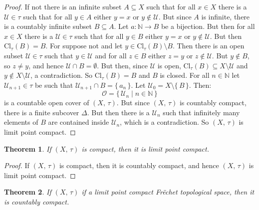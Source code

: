 \documentclass{article}
\theoremstyle{plain}
\newtheorem{theorem}{Theorem}[section]
\theoremstyle{normal}
\begin{document}
        \begin{proof}
            If not there is an infinite subset $A\subseteq{X}$ such that for
            all $x\in{X}$ there is a $\mathcal{U}\in\tau$ such that for all
            $y\in{A}$ either $y=x$ or $y\notin\mathcal{U}$. But since
            $A$ is infinite, there is a countably infinite subset
            $B\subseteq{A}$. Let $a:\mathbb{N}\rightarrow{B}$ be a bijection.
            But then for all $x\in{X}$ there is a
            $\mathcal{U}\in\tau$ such that for all $y\in{B}$ either
            $y=x$ or $y\notin\mathcal{U}$. But then
            $\textrm{Cl}_{\tau}(B)=B$. For suppose not and let
            $y\in\textrm{Cl}_{\tau}(B)\setminus{B}$. Then there is an open
            subset $\mathcal{U}\in\tau$ such that $y\in\mathcal{U}$ and for
            all $z\in{B}$ either $z=y$ or $z\notin\mathcal{U}$. But
            $y\notin{B}$, so $z\ne{y}$, and hence
            $\mathcal{U}\cap{B}=\emptyset$. But then, since $\mathcal{U}$ is
            open, $\textrm{Cl}_{\tau}(B)\subseteq{X}\setminus\mathcal{U}$ and
            $y\notin{X}\setminus\mathcal{U}$, a contradiction. So
            $\textrm{Cl}_{\tau}(B)=B$ and $B$ is closed. For all
            $n\in\mathbb{N}$ let $\mathcal{U}_{n+1}\in\tau$ be such that
            $\mathcal{U}_{n+1}\cap{B}=\{\,a_{n}\,\}$. Let
            $\mathcal{U}_{0}=X\setminus\{\,B\,\}$. Then:
            \begin{equation}
                \mathcal{O}=
                \{\,\mathcal{U}_{n}\;|\;n\in\mathbb{N}\,\}
            \end{equation}
            is a countable open cover of $(X,\,\tau)$. But since $(X,\,\tau)$
            is countably compact, there is a finite subcover $\Delta$. But
            then there is a $\mathcal{U}_{n}$ such that infinitely many
            elements of $B$ are contained inside $\mathcal{U}_{n}$, which is
            a contradiction. So $(X,\,\tau)$ is limit point compact.
        \end{proof}
        \begin{theorem}
            If $(X,\,\tau)$ is compact, then it is limit point compact.
        \end{theorem}
        \begin{proof}
            If $(X,\,\tau)$ is compact, then it is countably compact, and hence
            $(X,\,\tau)$ is limit point compact.
        \end{proof}
        \begin{theorem}
            If $(X,\,\tau)$ if a limit point compact Fr\"{e}chet topological
            space, then it is countably compact.
        \end{theorem}
\end{document}
